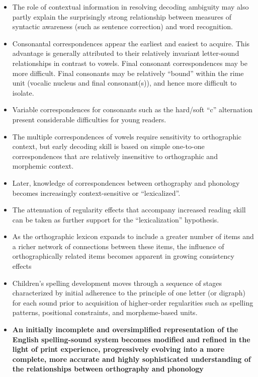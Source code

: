 \documentclass[]{article}
\begin{document}
\begin{itemize}
			\item The role of contextual information in resolving decoding ambiguity may also partly explain the surprisingly strong relationship between measures of syntactic awareness (such as sentence correction) and word recognition.
			\item Consonantal correspondences appear the earliest and easiest to acquire. This advantage is generally attributed to their relatively invariant letter-sound relationships in contrast to vowels. Final consonant correspondences may be more difficult. Final consonants may be relatively ``bound'' within the rime unit (vocalic nucleus and final consonant(s)), and hence more difficult to isolate.
			\item Variable correspondences for consonants such as the hard/soft ``c'' alternation present considerable difficulties for young readers. 
			\item The multiple correspondences of vowels require sensitivity to orthographic context, but early decoding skill is based on simple one-to-one correspondences that are relatively insensitive to orthographic and morphemic context.
			\item Later, knowledge of correspondences between orthography and 	phonology becomes increasingly context-sensitive or ``lexicalized''.
			\item The attenuation of regularity effects that accompany increased reading skill can be taken as further support for the ``lexicalization'' hypothesis.
			\item As the orthographic lexicon expands to include a greater number of items and a richer network of connections between these items, the influence of orthographically related items becomes apparent in growing consistency effects
			\item Children's spelling development moves through a sequence of stages characterized by initial adherence to the principle of one letter (or digraph) for each sound prior to acquisition of higher-order regularities such as spelling patterns, positional constraints, and morpheme-based units.
			\item \textbf{An initially incomplete and oversimplified representation of the English spelling-sound system becomes modified and refined in the light of print experience, progressively evolving into a more complete, more accurate and highly sophisticated understanding of the relationships between orthography and phonology}
	\end{itemize}
	
\end{document}
